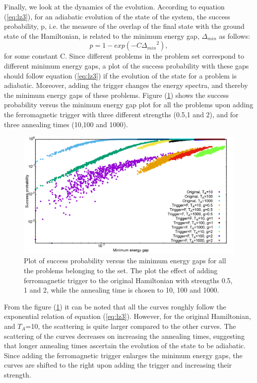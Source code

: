 \documentclass[12]{article}
\begin{document}
Finally, we look at the dynamics of the evolution. According to equation (\ref{eq:lz3}), for an adiabatic evolution of the state of the system, the success probability, p, i.e. the measure of the overlap of the final state with the ground state of the Hamiltonian, is related to the minimum energy gap, $\Delta_{min}$ as follows:
\begin{equation}
p=1-exp(-C{\Delta_{min}}^2),
\end{equation}
for some constant C. Since different problems in the problem set correspond to different minimum energy gaps, a plot of the success probability with these gaps should follow equation (\ref{eq:lz3}) if the evolution of the state for a problem is adiabatic. Moreover, adding the trigger changes the energy spectra, and thereby the minimum energy gaps of these problems. Figure (\ref{fig:f14}) shows the success probability versus the minimum energy gap plot for all the problems upon adding the ferromagnetic trigger with three different strengths (0.5,1 and 2), and for three annealing times (10,100 and 1000).

\begin{figure}[H]
\centering
\includegraphics[scale=0.3]{SuccVsGap_OF_g.png}
\caption{Plot of success probability versus the minimum energy gaps for all the problems belonging to the set. The plot the effect of adding ferromagnetic trigger to the original Hamiltonian with strengths 0.5, 1 and 2, while the annealing time is chosen to 10, 100 and 1000.}
\label{fig:f14}
\end{figure} 

From the figure (\ref{fig:f14}) it can be noted that all the curves roughly follow the exponential  relation of equation (\ref{eq:lz3}). However, for the original Hamiltonian, and $T_A$=10, the scattering is quite larger compared to the other curves. The scattering of the curves decreases on increasing the annealing times, suggesting that longer annealing times ascertain the evolution of the state to be adiabatic. Since adding the ferromagnetic trigger enlarges the minimum energy gaps, the curves are shifted to the right upon adding the trigger and increasing their strength. 
\end{document}
